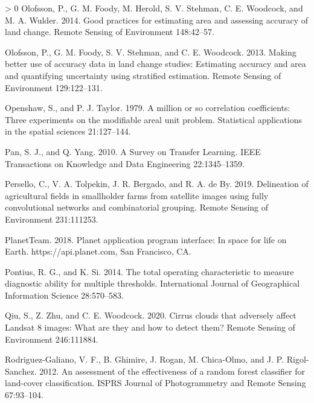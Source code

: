\documentclass[11pt,a4paper]{article}
\newlength{\cslhangindent}
\newenvironment{CSLReferences}[3] %
 {%
  \setlength{\parindent}{0pt}
  \ifodd #1 \everypar{\setlength{\hangindent}{\cslhangindent}}\ignorespaces\fi
  \ifnum #2 > 0
  \setlength{\parskip}{#2\baselineskip}
  \fi
 }%
 {}
\begin{document}
\begin{CSLReferences}{1}{0}
\leavevmode\hypertarget{ref-OlofssonGoodpracticesestimating2014}{}%
Olofsson, P., G. M. Foody, M. Herold, S. V. Stehman, C. E. Woodcock, and
M. A. Wulder. 2014. Good practices for estimating area and assessing
accuracy of land change. Remote Sensing of Environment 148:42--57.

\leavevmode\hypertarget{ref-OlofssonMakingbetteruse2013}{}%
Olofsson, P., G. M. Foody, S. V. Stehman, and C. E. Woodcock. 2013.
Making better use of accuracy data in land change studies: {Estimating}
accuracy and area and quantifying uncertainty using stratified
estimation. Remote Sensing of Environment 129:122--131.

\leavevmode\hypertarget{ref-Openshawmillioncorrelationcoefficients1979}{}%
Openshaw, S., and P. J. Taylor. 1979. A million or so correlation
coefficients: Three experiments on the modifiable areal unit problem.
Statistical applications in the spatial sciences 21:127--144.

\leavevmode\hypertarget{ref-panSurveyTransferLearning2010}{}%
Pan, S. J., and Q. Yang. 2010. A {Survey} on {Transfer Learning}. IEEE
Transactions on Knowledge and Data Engineering 22:1345--1359.

\leavevmode\hypertarget{ref-perselloDelineationAgriculturalFields2019}{}%
Persello, C., V. A. Tolpekin, J. R. Bergado, and R. A. de By. 2019.
Delineation of agricultural fields in smallholder farms from satellite
images using fully convolutional networks and combinatorial grouping.
Remote Sensing of Environment 231:111253.

\leavevmode\hypertarget{ref-planetteamPlanetApplicationProgram2018}{}%
PlanetTeam. 2018. Planet application program interface: In space for
life on {Earth}. {https://api.planet.com}, {San Francisco, CA}.

\leavevmode\hypertarget{ref-Pontiustotaloperatingcharacteristic2014}{}%
Pontius, R. G., and K. Si. 2014. The total operating characteristic to
measure diagnostic ability for multiple thresholds. International
Journal of Geographical Information Science 28:570--583.

\leavevmode\hypertarget{ref-qiuCirrusCloudsThat2020}{}%
Qiu, S., Z. Zhu, and C. E. Woodcock. 2020. Cirrus clouds that adversely
affect {Landsat} 8 images: {What} are they and how to detect them?
Remote Sensing of Environment 246:111884.

\leavevmode\hypertarget{ref-rodriguez-galianoAssessmentEffectivenessRandom2012}{}%
Rodriguez-Galiano, V. F., B. Ghimire, J. Rogan, M. Chica-Olmo, and J. P.
Rigol-Sanchez. 2012. An assessment of the effectiveness of a random
forest classifier for land-cover classification. ISPRS Journal of
Photogrammetry and Remote Sensing 67:93--104.


\end{CSLReferences}
\end{document}
